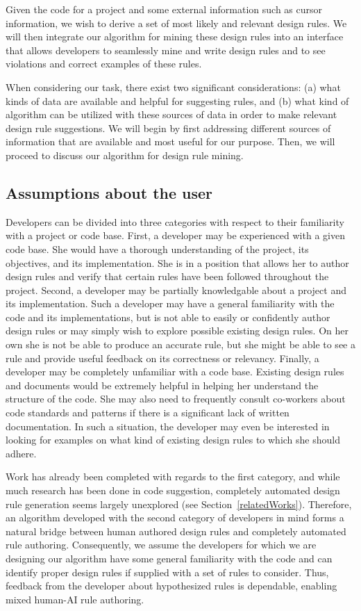 \documentclass[12pt]{article}
\begin{document}
Given the code for a project and some external information such as cursor information, we wish to derive a set of most likely and relevant design rules. We will then integrate our algorithm for mining these design rules into an interface that allows developers to seamlessly mine and write design rules and to see violations and correct examples of these rules. 

When considering our task, there exist two significant considerations: (a) what kinds of data are available and helpful for suggesting rules, and (b) what kind of algorithm can be utilized with these sources of data in order to make relevant design rule suggestions. We will begin by first addressing different sources of information that are available and most useful for our purpose. Then, we will proceed to discuss our algorithm for design rule mining.


\subsection{Assumptions about the user} \label{assumptions}

Developers can be divided into three categories with respect to their familiarity with a project or code base. First, a developer may be experienced with a given code base. She would have a thorough understanding of the project, its objectives, and its implementation. She is in a position that allows her to author design rules and verify that certain rules have been followed throughout the project. Second, a developer may be partially knowledgable about a project and its implementation. Such a developer may have a general familiarity with the code and its implementations, but is not able to easily or confidently author design rules or may simply wish to explore possible existing design rules. On her own she is not be able to produce an accurate rule, but she might be able to see a rule and provide useful feedback on its correctness or relevancy. Finally, a developer may be completely unfamiliar with a code base. Existing design rules and documents would be extremely helpful in helping her understand the structure of the code. She may also need to frequently consult co-workers about code standards and patterns if there is a significant lack of written documentation. In such a situation, the developer may even be interested in looking for examples on what kind of existing design rules to which she should adhere.

 Work has already been completed with regards to the first category, and while much research has been done in code suggestion, completely automated design rule generation seems largely unexplored (see Section~\ref{relatedWorks}). Therefore, an algorithm developed with the second category of developers in mind forms a natural bridge between human authored design rules and completely automated rule authoring. Consequently, we assume the developers for which we are designing our algorithm have some general familiarity with the code and can identify proper design rules if supplied with a set of rules to consider. Thus, feedback from the developer about hypothesized rules is dependable, enabling mixed human-AI rule authoring.
\end{document}

